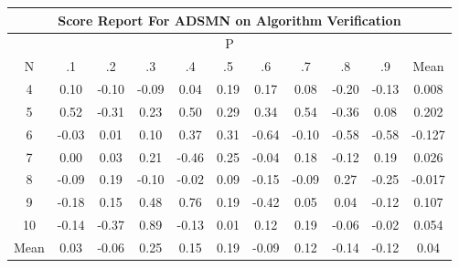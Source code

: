 \documentclass[11pt,a4paper]{report}
\begin{document}
\begin{longtable}{ | c || c | c | c | c | c | c | c | c | c || c |}
\hline
\multicolumn{11}{|c|}{ Score Report For ADSMN on Algorithm Verification} \\
\hline
\multicolumn{11}{|c|}{ P } \\
\hline
N & .1 & .2 & .3 & .4 & .5 & .6 & .7 & .8 & .9 & Mean\\
 \hline
 \hline
 \endhead
  4 &  \cellcolor[HTML]{FFFFFF} 0.10 &  \cellcolor[HTML]{FFFFFF} -0.10 &  \cellcolor[HTML]{FFFFFF} -0.09 &  \cellcolor[HTML]{FFFFFF} 0.04 &  \cellcolor[HTML]{F7F7FF} 0.19 &  \cellcolor[HTML]{F7F7FF} 0.17 &  \cellcolor[HTML]{FFFFFF} 0.08 &  \cellcolor[HTML]{FFF7F7} -0.20 &  \cellcolor[HTML]{FFFFFF} -0.13 & 0.008 \\
  5 &  \cellcolor[HTML]{EFEFFF} 0.52 &  \cellcolor[HTML]{FFF7F7} -0.31 &  \cellcolor[HTML]{F7F7FF} 0.23 &  \cellcolor[HTML]{EFEFFF} 0.50 &  \cellcolor[HTML]{F7F7FF} 0.29 &  \cellcolor[HTML]{F7F7FF} 0.34 &  \cellcolor[HTML]{EFEFFF} 0.54 &  \cellcolor[HTML]{FFF7F7} -0.36 &  \cellcolor[HTML]{FFFFFF} 0.08 & 0.202 \\
  6 &  \cellcolor[HTML]{FFFFFF} -0.03 &  \cellcolor[HTML]{FFFFFF} 0.01 &  \cellcolor[HTML]{FFFFFF} 0.10 &  \cellcolor[HTML]{F7F7FF} 0.37 &  \cellcolor[HTML]{F7F7FF} 0.31 &  \cellcolor[HTML]{FFEFEF} -0.64 &  \cellcolor[HTML]{FFFFFF} -0.10 &  \cellcolor[HTML]{FFEFEF} -0.58 &  \cellcolor[HTML]{FFEFEF} -0.58 & -0.127 \\
  7 &  \cellcolor[HTML]{FFFFFF} 0.00 &  \cellcolor[HTML]{FFFFFF} 0.03 &  \cellcolor[HTML]{F7F7FF} 0.21 &  \cellcolor[HTML]{FFF7F7} -0.46 &  \cellcolor[HTML]{F7F7FF} 0.25 &  \cellcolor[HTML]{FFFFFF} -0.04 &  \cellcolor[HTML]{F7F7FF} 0.18 &  \cellcolor[HTML]{FFFFFF} -0.12 &  \cellcolor[HTML]{F7F7FF} 0.19 & 0.026 \\
  8 &  \cellcolor[HTML]{FFFFFF} -0.09 &  \cellcolor[HTML]{F7F7FF} 0.19 &  \cellcolor[HTML]{FFFFFF} -0.10 &  \cellcolor[HTML]{FFFFFF} -0.02 &  \cellcolor[HTML]{FFFFFF} 0.09 &  \cellcolor[HTML]{FFFFFF} -0.15 &  \cellcolor[HTML]{FFFFFF} -0.09 &  \cellcolor[HTML]{F7F7FF} 0.27 &  \cellcolor[HTML]{FFF7F7} -0.25 & -0.017 \\
  9 &  \cellcolor[HTML]{FFF7F7} -0.18 &  \cellcolor[HTML]{FFFFFF} 0.15 &  \cellcolor[HTML]{EFEFFF} 0.48 &  \cellcolor[HTML]{EFEFFF} 0.76 &  \cellcolor[HTML]{F7F7FF} 0.19 &  \cellcolor[HTML]{FFF7F7} -0.42 &  \cellcolor[HTML]{FFFFFF} 0.05 &  \cellcolor[HTML]{FFFFFF} 0.04 &  \cellcolor[HTML]{FFFFFF} -0.12 & 0.107 \\
  10 &  \cellcolor[HTML]{FFFFFF} -0.14 &  \cellcolor[HTML]{FFF7F7} -0.37 &  \cellcolor[HTML]{E7E7FF} 0.89 &  \cellcolor[HTML]{FFFFFF} -0.13 &  \cellcolor[HTML]{FFFFFF} 0.01 &  \cellcolor[HTML]{FFFFFF} 0.12 &  \cellcolor[HTML]{F7F7FF} 0.19 &  \cellcolor[HTML]{FFFFFF} -0.06 &  \cellcolor[HTML]{FFFFFF} -0.02 & 0.054 \\
 \hline
 \hline
Mean &  \cellcolor[HTML]{FFFFFF} 0.03 &  \cellcolor[HTML]{FFFFFF} -0.06 &  \cellcolor[HTML]{F7F7FF} 0.25 &  \cellcolor[HTML]{FFFFFF} 0.15 &  \cellcolor[HTML]{F7F7FF} 0.19 &  \cellcolor[HTML]{FFFFFF} -0.09 &  \cellcolor[HTML]{FFFFFF} 0.12 &  \cellcolor[HTML]{FFFFFF} -0.14 &  \cellcolor[HTML]{FFFFFF} -0.12 &  \cellcolor[HTML]{FFFFFF} 0.04
\end{longtable}
\end{document}
